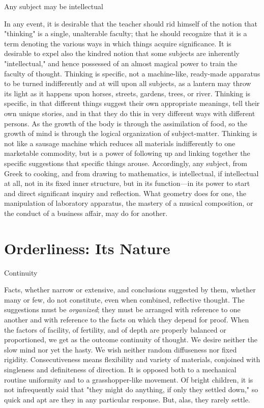 \documentclass[letterpaper]{book}
\begin{document}
Any subject may be intellectual

In any event, it is desirable that the teacher should rid himself of the
notion that "thinking" is a single, unalterable faculty; that he should
recognize that it is a term denoting the various ways in which things
acquire
significance. It is desirable to expel also the kindred notion that some
subjects are inherently "intellectual," and hence possessed of an almost
magical power to train the faculty of thought. Thinking is specific, not
a machine-like, ready-made apparatus to be turned indifferently and at
will upon all subjects, as a lantern may throw its light as it happens
upon horses, streets, gardens, trees, or river. Thinking is specific, in
that different things suggest their own appropriate meanings, tell their
own unique stories, and in that they do this in very different ways with
different persons. As the growth of the body is through the assimilation
of food, so the growth of mind is through the logical organization of
subject-matter. Thinking is not like a sausage machine which reduces all
materials indifferently to one marketable commodity, but is a power of
following up and linking together the specific suggestions that specific
things arouse. Accordingly, any subject, from Greek to cooking, and from
drawing to mathematics, is intellectual, if intellectual at all, not in
its fixed inner structure, but in its function---in its power to start
and direct significant inquiry and reflection. What geometry does for
one, the manipulation of laboratory apparatus, the mastery of a musical
composition, or the conduct of a business affair, may do for another.

\section{Orderliness: Its Nature}

Continuity

Facts, whether narrow or extensive, and conclusions suggested by them,
whether many or few, do not constitute, even when combined, reflective
thought. The suggestions must be \emph{organized}; they must be arranged
with reference to one another and with reference to the facts on which
they depend for proof. When
the
factors of facility, of fertility, and of depth are properly balanced or
proportioned, we get as the outcome continuity of thought. We desire
neither the slow mind nor yet the hasty. We wish neither random
diffuseness nor fixed rigidity. Consecutiveness means flexibility and
variety of materials, conjoined with singleness and definiteness of
direction. It is opposed both to a mechanical routine uniformity and to
a grasshopper-like movement. Of bright children, it is not infrequently
said that "they might do anything, if only they settled down," so quick
and apt are they in any particular response. But, alas, they rarely
settle.
\end{document}
